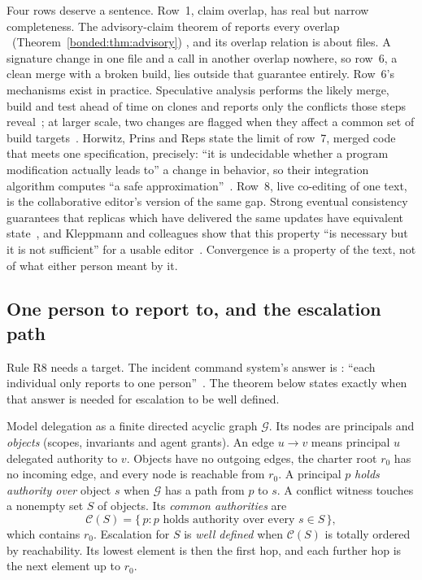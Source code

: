 Four rows deserve a sentence. Row~1, claim overlap, has real but narrow completeness. The
advisory-claim theorem of  reports every
overlap%
\ifpdbook
\ (Theorem~\ref{bonded:thm:advisory})%
\fi
, and its overlap relation is about files. A signature change in one file and a
call in another overlap nowhere, so row~6, a clean merge with a broken build,
lies outside that guarantee entirely. Row~6's mechanisms exist in practice. Speculative analysis performs
the likely merge, build and test ahead of time on clones and reports only the
conflicts those steps reveal~; at larger scale, two
changes are flagged when they affect a common set of build
targets~. Horwitz, Prins and Reps state the limit of row~7, merged code that meets one specification, precisely: ``it is
undecidable whether a program modification actually leads to'' a change in
behavior, so their integration algorithm computes ``a safe
approximation''~. Row~8, live co-editing of one text, is the collaborative
editor's version of the same gap. Strong eventual consistency guarantees that
replicas which have delivered the same updates have equivalent
state~, and Kleppmann and colleagues show that this
property ``is necessary but it is not sufficient'' for a usable
editor~. Convergence is a property of the
text, not of what either person meant by it.

\subsection{One person to report to, and the escalation path}\label{sec:ls-many-authors-escalation}

Rule R8 needs a target. The incident command system's answer is
: ``each individual only reports to one person''~.
The theorem below states exactly when that answer is needed for escalation to
be well defined.

Model delegation as a finite directed acyclic graph $\mathcal G$. Its nodes are
principals and \emph{objects} (scopes, invariants and agent grants). An edge
$u\to v$ means principal $u$ delegated authority to $v$. Objects have no
outgoing edges, the charter root $r_0$ has no incoming edge, and every node is
reachable from $r_0$. A principal $p$ \emph{holds authority over} object $s$ when
$\mathcal G$ has a path from $p$ to $s$. A conflict witness touches a nonempty set $S$
of objects. Its \emph{common authorities} are
\[
\mathcal C(S)=\{\,p : p \text{ holds authority over every } s\in S\,\},
\]
which contains $r_0$. Escalation for $S$ is \emph{well defined} when $\mathcal C(S)$ is
totally ordered by reachability. Its lowest element is then the first hop, and
each further hop is the next element up to $r_0$.

